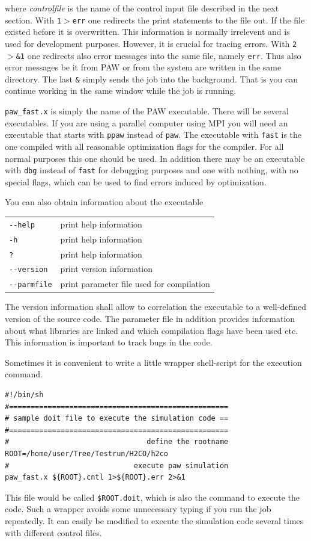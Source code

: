 \documentclass[final,12pt]{article}
\begin{document}
\noindent where {\it controlfile} is the name of the control input
file described in the next section.  With {\tt 1$>$err} one redirects
the print statements to the file out. If the file existed before it is
overwritten. This information is normally irrelevent and is used for
development purposes. However, it is crucial for tracing errors.  With
{\tt 2$>$\&1} one redirects also error messages into the same file,
namely {\tt err}. Thus also error messages be it from PAW or from the
system are written in the same directory. The last {\tt \&} simply
sends the job into the background. That is you can continue working in
the same window while the job is running.

{\tt paw\_fast.x} is simply the name of the PAW executable. There will
be several executables. If you are using a parallel computer using MPI
you will need an executable that starts with {\tt ppaw} instead of
{\tt paw}. The executable with {\tt fast} is the one compiled with all
reasonable optimization flags for the compiler. For all normal
purposes this one should be used. In addition there may be an
executable with {\tt dbg} instead of {\tt fast} for debugging purposes
and one with nothing, with no special flags, which can be used to find
errors induced by optimization.

You can also obtain information about the executable
\begin{center}
\begin{tabular}{ll}
\verb+--help+ & print help information \\
\verb+-h+ & print help information \\
\verb+?+ & print help information \\
\verb+--version+ & print version information\\
\verb+--parmfile+ & print parameter file used for compilation\\
\end{tabular}
\end{center}
The version information shall allow to correlation the executable to a
well-defined version of the source code. The parameter file in
addition provides information about what libraries are linked and
which compilation flags have been used etc. This information is
important to track bugs in the code.

Sometimes it is convenient to write a little wrapper shell-script for
the execution command.
\begin{verbatim}
#!/bin/sh
#===================================================
# sample doit file to execute the simulation code ==
#===================================================
#                                define the rootname 
ROOT=/home/user/Tree/Testrun/H2CO/h2co                               
#                             execute paw simulation
paw_fast.x ${ROOT}.cntl 1>${ROOT}.err 2>&1
\end{verbatim}
This file would be called {\tt \${ROOT}.doit}, which is
also the command to execute the code.  Such a wrapper avoids some
unnecessary typing if you run the job repeatedly. It can easily be
modified to execute the simulation code several times with different
control files.
\end{document}
